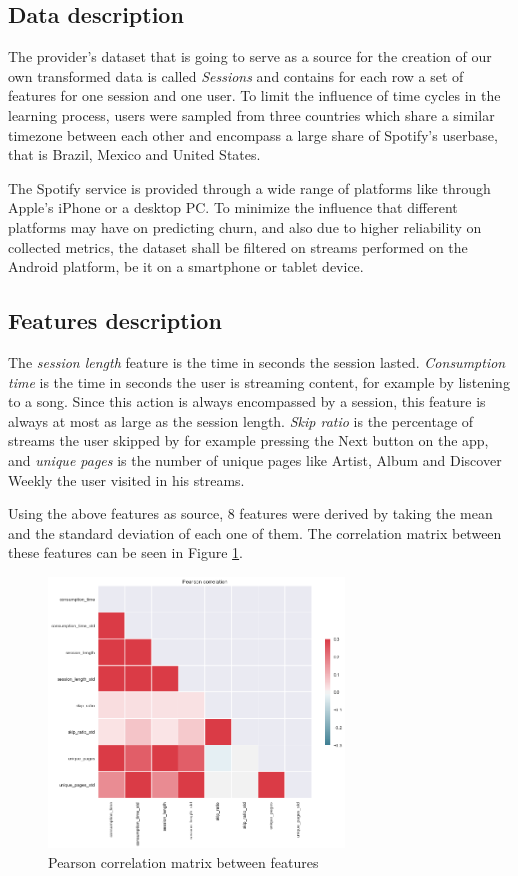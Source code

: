 \documentclass{kththesis}
\begin{document}
\subsection{Data description}

The provider's dataset that is going to serve as a source for the creation of our own transformed data is called \emph{Sessions} and contains for each row a set of features for one session and one user.  To limit the influence of time cycles in the learning process, users were sampled from three countries which share a similar timezone between each other and encompass a large share of Spotify's userbase, that is Brazil, Mexico and United States.

The Spotify service is provided through a wide range of platforms like through Apple's iPhone or a desktop PC. To minimize the influence that different platforms may have on predicting churn, and also due to higher reliability on collected metrics, the dataset shall be filtered on streams performed on the Android platform, be it on a smartphone or tablet device.

\subsection{Features description}

The \emph{session length} feature is the time in seconds the session lasted. \emph{Consumption time} is the time in seconds the user is streaming content, for example by listening to a song. Since this action is always encompassed by a session, this feature is always at most as large as the session length. \emph{Skip ratio} is the percentage of streams the user skipped by for example pressing the Next button on the app, and \emph{unique pages} is the number of unique pages like Artist, Album and Discover Weekly the user visited in his streams.

Using the above features as source, 8 features were derived by taking the mean and the standard deviation of each one of them. The correlation matrix between these features can be seen in Figure \ref{fig:correlation}.

	\begin{figure}[h]
    \centering
    \includegraphics[width=0.7\textwidth, natwidth=580bp, natheight=313bp]{figures/correlation.png}
    \caption{Pearson correlation matrix between features}
    \label{fig:correlation}
\end{figure}
\end{document}
